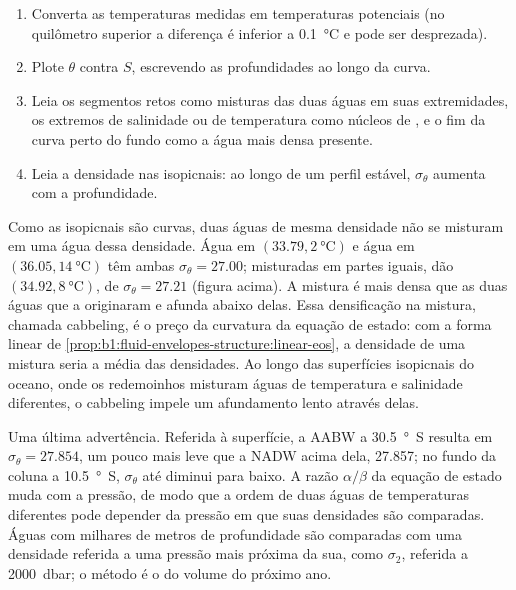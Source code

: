 \begin{method}\label{met:b1:fluid-envelopes-structure:ts}
\begin{enumerate}
  \item Converta as temperaturas medidas em temperaturas potenciais (no quilômetro superior a
        diferença é inferior a \qty{0.1}{\celsius} e pode ser desprezada).
  \item Plote $\theta$ contra $S$, escrevendo as profundidades ao longo da curva.
  \item Leia os segmentos retos como misturas das duas águas em suas extremidades, os extremos de
        salinidade ou de temperatura como núcleos de , e o fim da curva perto do fundo
        como a água mais densa presente.
  \item Leia a densidade nas isopicnais: ao longo de um perfil estável, $\sigma_\theta$ aumenta
        com a profundidade.
\end{enumerate}
\end{method}

Como as isopicnais são curvas, duas águas de mesma densidade não se misturam em uma água dessa
densidade. Água em $(33.79, \qty{2}{\celsius})$ e água em $(36.05, \qty{14}{\celsius})$ têm ambas
$\sigma_\theta = 27.00$; misturadas em partes iguais, dão $(34.92, \qty{8}{\celsius})$, de
$\sigma_\theta = 27.21$ (figura acima). A mistura é mais densa que as duas águas que a originaram
e afunda abaixo delas.
Essa densificação na mistura, chamada cabbeling, é o preço da curvatura da equação de estado: com a
forma linear de \cref{prop:b1:fluid-envelopes-structure:linear-eos}, a densidade de uma mistura
seria a média das densidades. Ao longo das superfícies isopicnais do oceano, onde os redemoinhos
misturam águas de temperatura e salinidade diferentes, o cabbeling impele um afundamento lento
através delas.

Uma última advertência. Referida à superfície, a AABW a \qty{30.5}{\degree S} resulta em
$\sigma_\theta = 27.854$, um pouco mais leve que a NADW acima dela, \num{27.857}; no fundo da
coluna a \qty{10.5}{\degree S}, $\sigma_\theta$ até diminui para baixo. A razão $\alpha/\beta$ da
equação de estado muda com a pressão, de modo que a ordem de duas águas de temperaturas diferentes
pode depender da pressão em que suas densidades são comparadas. Águas com milhares de metros de
profundidade são comparadas com uma densidade referida a uma pressão mais próxima da sua, como
$\sigma_2$, referida a \qty{2000}{dbar}; o método é o do volume do próximo ano.

